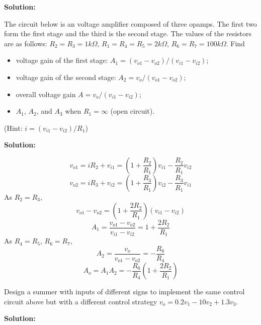 


{\bf Solution:}
\item The circuit below is an voltage amplifier composed of three
opamps. The first two form the first stage and the third is the 
second stage. The values of the resistors are as follows: 
$R_2=R_3=1k\Omega$, $R_1=R_4=R_5=2k\Omega$, $R_6=R_7=100k\Omega$.
Find 
\begin{itemize}
\item voltage gain of the first stage: $A_1=(v_{o1}-v_{o2})/(v_{i1}-v_{i2})$;
\item voltage gain of the second stage: $A_2=v_o/(v_{o1}-v_{o2})$;
\item overall voltage gain $A=v_o/(v_{i1}-v_{i2})$;
\item $A_1$, $A_2$, and $A_3$ when $R_1=\infty$ (open circuit).
\end{itemize}

(Hint: $i=(v_{i1}-v_{i2})/R_1$)


{\bf Solution:}

\[ v_{o1}=iR_2+v_{i1}=(1+\frac{R_2}{R_1})v_{i1}-\frac{R_2}{R_1}v_{i2} \]
\[ v_{o2}=iR_3+v_{i2}=(1+\frac{R_3}{R_1})v_{i2}-\frac{R_3}{R_1}v_{i1} \]
As $R_2=R_3$, 
\[ v_{o1}-v_{o2}=(1+\frac{2R_2}{R_1})(v_{i1}-v_{i2})	\]
\[ A_1=\frac{v_{o1}-v_{o2}}{v_{i1}-v_{i2}}=1+\frac{2R_2}{R_1}	\]
As $R_4=R_5$, $R_6=R_7$, 
\[ A_2=\frac{v_o}{v_{o1}-v_{o2}}=-\frac{R_6}{R_4} \]
\[ A_o=A_1 A_2=-\frac{R_6}{R_4}(1+\frac{2R_2}{R_1})	\]

\item Design a summer with inputs of different signs to implement the 
same control circuit above but with a different control strategy 
$v_o=0.2 v_1-10 v_2+1.3 v_3$. 

{\bf Solution:}


